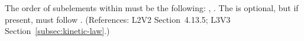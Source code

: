 The order of subelements within \KineticLaw must be the following:
, .  The  is
optional, but if present, must follow .  (References: L2V2
Section~4.13.5; L3V3 Section~\ref{subsec:kinetic-law}.)
